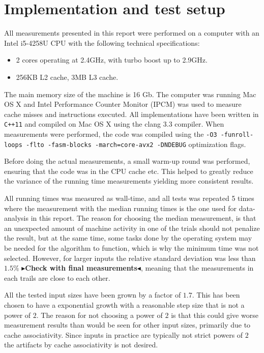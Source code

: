 \documentclass[twoside,11pt,openright]{report}
\newcommand{\todo}[1]{{\color[rgb]{.5,0,0}\textbf{$\blacktriangleright$#1$\blacktriangleleft$}}}
\begin{document}
\section{Implementation and test setup}
All measurements presented in this report were performed on a computer with an Intel i5-4258U CPU with the following technical specifications:
\begin{itemize}
  \item 2 cores operating at 2.4GHz, with turbo boost up to 2.9GHz.
  \item 256KB L2 cache, 3MB L3 cache.
\end{itemize}
The main memory size of the machine is 16 Gb. The computer was running Mac OS X and Intel Performance Counter Monitor (IPCM) was used to measure cache misses and instructions executed. All implementations have been written in \texttt{C++11} and compiled on  Mac OS X using the clang 3.3 compiler. When measurements were performed, the code was compiled using the \texttt{-O3 -funroll-loops -flto -fasm-blocks -march=core-avx2 -DNDEBUG} optimization flags.

Before doing the actual measurements, a small warm-up round was performed, ensuring that the code was in the CPU cache etc. This helped to greatly reduce the variance of the running time measurements yielding more consistent results.

All running times was measured as wall-time, and all tests was repeated 5 times where the measurement with the median running times is the one used for data-analysis in this report. The reason for choosing the median measurement, is that an unexpected amount of machine activity in one of the trials should not penalize the result, but at the same time, some tasks done by the operating system may be needed for the algorithm to function, which is why the minimum time was not selected. However, for larger inputs the relative standard deviation was less than $1.5\%$ \todo{Check with final measurements}, meaning that the measurements in each trails are close to each other.

All the tested input sizes have been grown by a factor of $1.7$. This has been chosen to have a exponential growth with a reasonable step size that is not a power of $2$. The reason for not choosing a power of $2$ is that this could give worse measurement results than would be seen for other input sizes, primarily due to cache associativity. Since inputs in practice are typically not strict powers of $2$ the artifacts by cache associativity is not desired.
\end{document}
